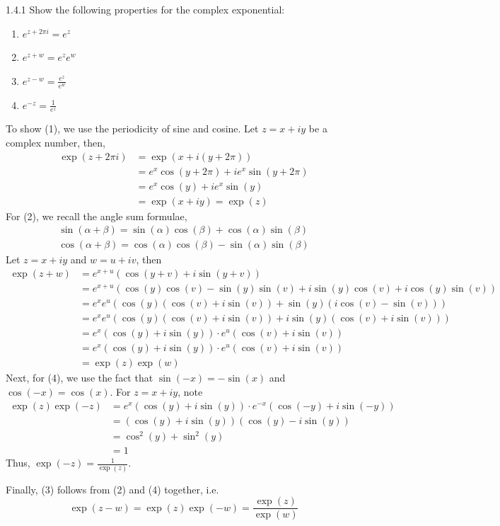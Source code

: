 \documentclass[12pt]{amsart}
\begin{document}


\begin{problem}{1.4.1}
    Show the following properties for the complex exponential: 
    \begin{enumerate}
        \item $e^{z+2\pi i} = e^z$
        \item $e^{z+w} = e^ze^w$
        \item $e^{z-w} = \frac{e^z}{e^w}$
        \item $e^{-z} = \frac{1}{e^z}$
    \end{enumerate}
\end{problem}
\begin{solution}
    To show (1), we use the periodicity of sine and cosine. Let $z = x+iy$ be a complex number, then,
        \begin{align*}
            \exp(z+ 2\pi i) &= \exp(x+i(y+2\pi)) \\
            &= e^x\cos(y+2\pi) + ie^x\sin(y+2\pi) \\
            &= e^x\cos(y) + ie^x\sin(y) \\
            &= \exp(x+iy) = \exp(z)
        \end{align*}
        For (2), we recall the angle sum formulae, 
        \begin{align*}
            \sin(\alpha + \beta) = \sin(\alpha)\cos(\beta) + \cos(\alpha)\sin(\beta)\\
            \cos(\alpha + \beta) = \cos(\alpha)\cos(\beta) - \sin(\alpha)\sin(\beta)
        \end{align*}
        Let $z = x+iy$ and $w = u+iv$, then
        \begin{align*}
            \exp(z+ w) &= e^{x + u}(\cos(y+ v)+i\sin(y+ v)) \\
            &= e^{x + u}(\cos(y)\cos(v)- \sin(y)\sin(v) + i\sin(y)\cos(v)+ i\cos(y)\sin(v)) \\
            &= e^xe^{u}( \cos(y)(\cos(v)+ i\sin(v)) + \sin(y)(i\cos(v)- \sin(v))) \\
            &= e^xe^{u}( \cos(y)(\cos(v)+ i\sin(v)) + i\sin(y)(\cos(v)+ i\sin(v))) \\
            &= e^x(\cos(y)+i\sin(y)) \cdot e^{u}(\cos(v) + i\sin(v)) \\
            &= e^x(\cos(y)+i\sin(y)) \cdot e^{u}(\cos(v) + i\sin(v)) \\
            &= \exp(z)\exp(w)
        \end{align*}
        Next, for (4), we use the fact that $\sin(-x) = -\sin(x)$ and $\cos(-x) = \cos(x)$. For $z = x+iy$, note
        \begin{align*}
            \exp(z)\exp(-z) &= e^x(\cos(y)+i\sin(y)) \cdot e^{-x}(\cos(-y)+i\sin(-y)) \\
            &= (\cos(y)+i\sin(y))(\cos(y)-i\sin(y)) \\
            &= \cos^2(y)+\sin^2(y) \\
            &= 1
        \end{align*}
        Thus, $\exp(-z) = \frac{1}{\exp(z)}$.

        Finally, (3) follows from (2) and (4) together, i.e.
        \[ \exp(z-w) = \exp(z)\exp(-w) = \frac{\exp(z)}{\exp(w)}\]
\end{solution}
\end{document}
